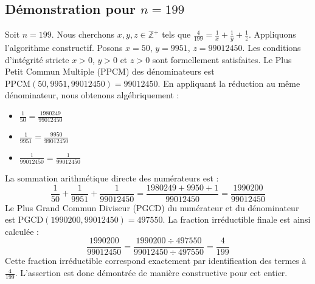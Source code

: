 \documentclass[11pt,a4paper]{article}
\begin{document}
\subsection{Démonstration pour $n = 199$}
Soit $n = 199$. Nous cherchons $x, y, z \in \mathbb{Z}^{+}$ tels que $\frac{4}{199} = \frac{1}{x} + \frac{1}{y} + \frac{1}{z}$.
Appliquons l'algorithme constructif. Posons $x = 50$, $y = 9951$, $z = 99012450$.
Les conditions d'intégrité stricte $x > 0$, $y > 0$ et $z > 0$ sont formellement satisfaites.
Le Plus Petit Commun Multiple (PPCM) des dénominateurs est $\text{PPCM}(50, 9951, 99012450) = 99012450$.
En appliquant la réduction au même dénominateur, nous obtenons algébriquement :
\begin{itemize}
    \item $\frac{1}{50} = \frac{1980249}{99012450}$
    \item $\frac{1}{9951} = \frac{9950}{99012450}$
    \item $\frac{1}{99012450} = \frac{1}{99012450}$
\end{itemize}
La sommation arithmétique directe des numérateurs est :
$$ \frac{1}{50} + \frac{1}{9951} + \frac{1}{99012450} = \frac{1980249 + 9950 + 1}{99012450} = \frac{1990200}{99012450} $$
Le Plus Grand Commun Diviseur (PGCD) du numérateur et du dénominateur est $\text{PGCD}(1990200, 99012450) = 497550$.
La fraction irréductible finale est ainsi calculée :
$$ \frac{1990200}{99012450} = \frac{1990200 \div 497550}{99012450 \div 497550} = \frac{4}{199} $$
Cette fraction irréductible correspond exactement par identification des termes à $\frac{4}{199}$. L'assertion est donc démontrée de manière constructive pour cet entier.
\end{document}
